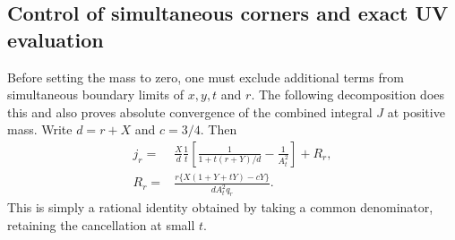 \documentclass[11pt,a4paper,oneside]{article}
\theoremstyle{plain}
\theoremstyle{definition}
\theoremstyle{remark}
\numberwithin{equation}{section}
\begin{document}
\subsection{Control of simultaneous corners and exact UV evaluation}\label{momrg:sec:bounds}
Before setting the mass to zero, one must exclude additional terms from simultaneous boundary limits of $x,y,t$ and $r$.
The following decomposition does this and also proves absolute convergence of the combined integral $J$ at positive mass.
Write $d=r+X$ and $c=3/4$. Then
\begin{align}
 j_r={}&\frac{X}{d}\frac1t
 \left[\frac1{1+t(r+Y)/d}-\frac1{A_t^2}\right]
 +R_r,\label{momrg:eq:decomposition}\\
 R_r={}&\frac{r\{X(1+Y+tY)-cY\}}{d A_t^2q_r}.
                                                        \label{momrg:eq:R}
\end{align}
This is simply a rational identity obtained by taking a common denominator, retaining the cancellation at small $t$.
\end{document}
